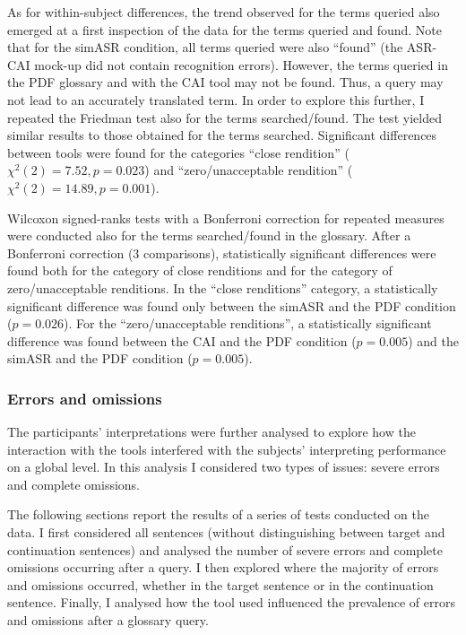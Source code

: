 As for within-subject differences, the trend observed for the terms queried also emerged at a first inspection of the data for the terms queried and found. Note that for the simASR condition, all terms queried were also ``found'' (the ASR-CAI mock-up did not contain recognition errors). However, the terms queried in the PDF glossary and with the CAI tool may not be found. Thus, a query may not lead to an accurately translated term. In order to explore this further, I repeated the Friedman test also for the terms searched/found. The test yielded similar results to those obtained for the terms searched. Significant differences between tools were found for the categories ``close rendition'' ($\chi^2(2) = 7.52, p = 0.023$) and ``zero\slash unacceptable rendition'' ($\chi^2(2) = 14.89, p = 0.001$).

Wilcoxon signed-ranks tests with a Bonferroni correction for repeated measures were conducted also for the terms searched/found in the glossary. After a Bonferroni correction (3 comparisons), statistically significant differences were found both for the category of close renditions and for the category of zero\slash unacceptable renditions. In the ``close renditions'' category, a statistically significant difference was found only between the simASR and the PDF condition ($p = 0.026$). For the ``zero\slash unacceptable renditions'', a statistically significant difference was found between the CAI and the PDF condition ($p = 0.005$) and the simASR and the PDF condition ($p = 0.005$).

\subsubsection{Errors and omissions} \label{errors_omissions}
The participants' interpretations were further analysed to explore how the interaction with the tools interfered with the subjects' interpreting performance on a global level. In this analysis I considered two types of issues: severe errors and complete omissions.

The following sections report the results of a series of tests conducted on the data. I first considered all sentences (without distinguishing between target and continuation sentences) and analysed the number of severe errors and complete omissions occurring after a query. I then explored where the majority of errors and omissions occurred, whether in the target sentence or in the continuation sentence. Finally, I analysed how the tool used influenced the prevalence of errors and omissions after a glossary query.

